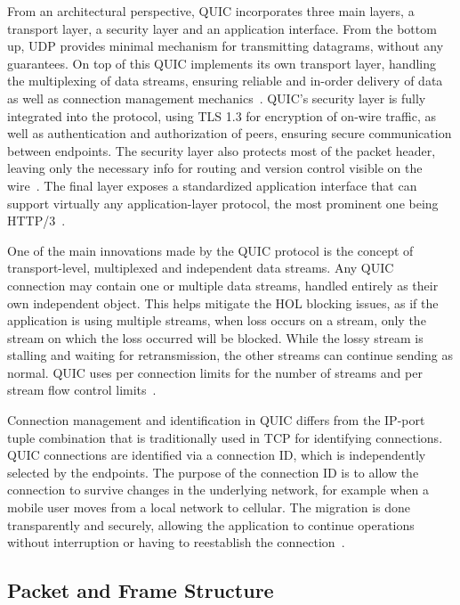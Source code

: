\documentclass[english, 12pt, a4paper, elec, utf8, a-2b, online]{aaltothesis}
\begin{document}
From an architectural perspective, QUIC incorporates three main layers, a transport
layer, a security layer and an application interface. From the bottom up, UDP provides
minimal mechanism for transmitting datagrams, without any guarantees. On top of this
QUIC implements its own transport layer, handling the multiplexing of data streams,
ensuring reliable and in-order delivery of data as well as connection management
mechanics~\cite{rfc9000}. QUIC's security layer is fully integrated into the protocol, using TLS 1.3
for encryption of on-wire traffic, as well as authentication and authorization of peers, ensuring
secure communication between endpoints. The security layer also protects most of
the packet header, leaving only the necessary info for routing and version control
visible on the wire~\cite{rfc9001}. The final layer exposes a standardized application
interface that can support virtually any application-layer protocol, the most prominent
one being HTTP/3~\cite{rfc9113}.

One of the main innovations made by the QUIC protocol is the concept of transport-level,
multiplexed and independent data streams. Any QUIC connection may contain one or multiple
data streams, handled entirely as their own independent object. This helps mitigate the
HOL blocking issues, as if the application is using multiple streams, when loss occurs on a stream,
only the stream on which the loss occurred will be blocked. While the lossy stream is
stalling and waiting for retransmission, the other streams can continue sending as 
normal. QUIC uses per connection limits for the number of streams and per stream
flow control limits~\cite{rfc9000}.

Connection management and identification in QUIC differs from the IP-port tuple
combination that is traditionally used in TCP for identifying connections. QUIC connections are identified via a
connection ID, which is independently selected by the endpoints. The purpose of the
connection ID is to allow the connection to survive changes in the underlying network, for example
when a mobile user moves from a local network to cellular. The migration is done transparently
and securely, allowing the application to continue operations without interruption or having
to reestablish the connection~\cite{rfc9000}.

\subsection{Packet and Frame Structure}
\end{document}
